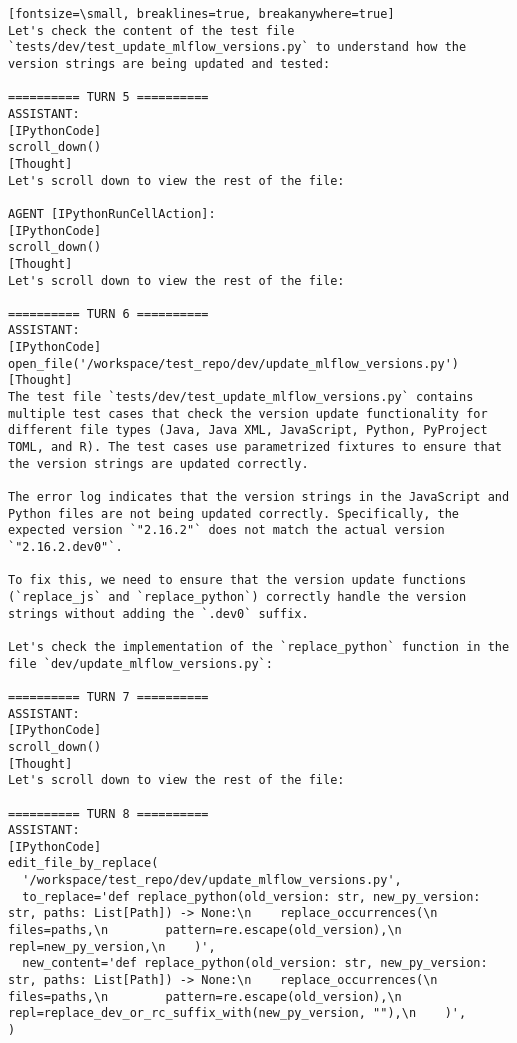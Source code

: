 \begin{verbatim}[fontsize=\small, breaklines=true, breakanywhere=true]
Let's check the content of the test file `tests/dev/test_update_mlflow_versions.py` to understand how the version strings are being updated and tested:

========== TURN 5 ==========
ASSISTANT:
[IPythonCode]
scroll_down()
[Thought]
Let's scroll down to view the rest of the file:

AGENT [IPythonRunCellAction]:
[IPythonCode]
scroll_down()
[Thought]
Let's scroll down to view the rest of the file:

========== TURN 6 ==========
ASSISTANT:
[IPythonCode]
open_file('/workspace/test_repo/dev/update_mlflow_versions.py')
[Thought]
The test file `tests/dev/test_update_mlflow_versions.py` contains multiple test cases that check the version update functionality for different file types (Java, Java XML, JavaScript, Python, PyProject TOML, and R). The test cases use parametrized fixtures to ensure that the version strings are updated correctly.

The error log indicates that the version strings in the JavaScript and Python files are not being updated correctly. Specifically, the expected version `"2.16.2"` does not match the actual version `"2.16.2.dev0"`.

To fix this, we need to ensure that the version update functions (`replace_js` and `replace_python`) correctly handle the version strings without adding the `.dev0` suffix.

Let's check the implementation of the `replace_python` function in the file `dev/update_mlflow_versions.py`:

========== TURN 7 ==========
ASSISTANT:
[IPythonCode]
scroll_down()
[Thought]
Let's scroll down to view the rest of the file:

========== TURN 8 ==========
ASSISTANT:
[IPythonCode]
edit_file_by_replace(
  '/workspace/test_repo/dev/update_mlflow_versions.py',
  to_replace='def replace_python(old_version: str, new_py_version: str, paths: List[Path]) -> None:\n    replace_occurrences(\n        files=paths,\n        pattern=re.escape(old_version),\n        repl=new_py_version,\n    )',
  new_content='def replace_python(old_version: str, new_py_version: str, paths: List[Path]) -> None:\n    replace_occurrences(\n        files=paths,\n        pattern=re.escape(old_version),\n        repl=replace_dev_or_rc_suffix_with(new_py_version, ""),\n    )',
)


\end{verbatim}
